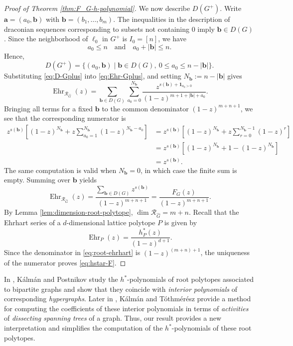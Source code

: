 \documentclass[11pt,a4paper]{article}
\newcommand{\vct}[1]{\boldsymbol{#1}}
\newcommand{\Ehr}{\operatorname{Ehr}}
\newcommand{\1}{\mathbf{1}}
\theoremstyle{plain}
\theoremstyle{definition}
\begin{document}
\begin{proof}[Proof of Theorem \ref{thm:F_G-h-polynomial}]
We now describe $D(G^+)$. Write $\vct{a}=(a_0,\vct{b})$ with $\vct{b}=(b_1,\ldots,b_m)$. The inequalities in the description of draconian sequences corresponding to subsets not containing $0$ imply $\vct{b}\in D(G)$. Since the neighborhood of $\ell_0$ in $G^+$ is $I_0 = [n]$, we have
\[a_0 \leq n \quad \text{and} \quad
a_0+|\vct{b}|\le n.
\]
Hence,
\begin{equation}
D(G^+)=\{(a_0,\vct{b})\mid \vct{b}\in D(G),\ 0\le a_0\le n-|\vct{b}|\}.
\label{eq:D-Gplus}
\end{equation}
Substituting \eqref{eq:D-Gplus} into \eqref{eq:Ehr-Gplus}, and setting $N_{\vct{b}}:=n-|\vct{b}|$ gives
\[
\Ehr_{\mathcal R_{\widehat G}}(z)
=\sum_{\vct{b}\in D(G)}\sum_{a_0=0}^{N_{\vct{b}}}
\frac{z^{s(\vct{b})+\mathbf 1_{a_0>0}}}
{(1-z)^{m+1+|\vct{b}|+a_0}}.
\]
Bringing all terms for a fixed $\vct{b}$ to the common denominator $(1-z)^{m+n+1}$, we see that the corresponding numerator is
\begin{align*}
z^{s(\vct{b})}
\left[(1-z)^{N_{\vct{b}}}+z\sum_{a_0=1}^{N_{\vct{b}}}(1-z)^{N_{\vct{b}}-a_0}\right]
&=z^{s(\vct{b})}
\left[(1-z)^{N_{\vct{b}}}+z\sum_{r=0}^{N_{\vct{b}}-1}(1-z)^r\right]\\
&=z^{s(\vct{b})}
\left[(1-z)^{N_{\vct{b}}}+1-(1-z)^{N_{\vct{b}}}\right]\\
&=z^{s(\vct{b})}.
\end{align*}
The same computation is valid when $N_{\vct{b}}=0$, in which case the finite sum is empty. Summing over $\vct{b}$ yields
\[
\Ehr_{\mathcal R_{\widehat G}}(z)
=\frac{\sum_{\vct{b}\in D(G)}z^{s(\vct{b})}}{(1-z)^{m+n+1}}
=\frac{F_G(z)}{(1-z)^{m+n+1}}.
\]
By Lemma \ref{lem:dimension-root-polytope}, $\dim\mathcal R_{\widehat G}=m+n$. Recall that the Ehrhart series of a $d$-dimensional lattice polytope $P$ is given by
\[
\Ehr_P(z)=\frac{h_P^*(z)}{(1-z)^{d+1}}.
\]
Since the denominator in \eqref{eq:root-ehrhart} is $(1-z)^{(m+n)+1}$, the uniqueness of the numerator proves \eqref{eq:hstar-F}.
\end{proof}


In \cite{KalmanPostnikov2017}, K\'alm\'an and Postnikov study the $h^*$-polynomials of root polytopes associated to bipartite graphs and show that they coincide with \emph{interior polynomials} of corresponding \emph{hypergraphs}. Later in \cite{Kalman2013RootPP}, K\'alm\'an and T\'othm\'er\'esz provide a method for computing the coefficients of these interior polynomials in terms of \emph{activities} of \emph{dissecting spanning trees} of a graph. Thus, our result provides a new interpretation and simplifies the computation of the $h^*$-polynomials of these root polytopes.  
\end{document}
